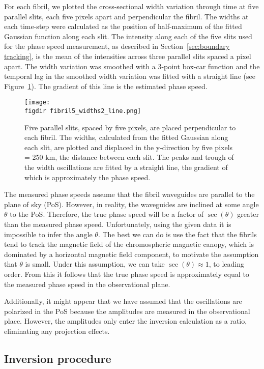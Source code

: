 \documentclass[12pt]{../style-files/ociamthesis}
\newcommand{\figdir}{../main/figures/chpt-4/} %
\begin{document}
For each fibril, we plotted the cross-sectional width variation through time at five parallel slits, each five pixels apart and perpendicular the fibril. The widths at each time-step were calculated as the position of half-maximum of the fitted Gaussian function along each slit. The intensity along each of the five slits used for the phase speed measurement, as described in Section~\ref{sec:boundary tracking}, is the mean of the intensities across three parallel slits spaced a pixel apart. The width variation was smoothed with a 3-point box-car function and the temporal lag in the smoothed width variation was fitted with a straight line (see Figure~\ref{fig:fibril5_width}). The gradient of this line is the estimated phase speed.

\begin{figure}
	\centering
	\texttt{[image: \\figdir fibril5\_widths2\_line.png]}
	\caption{Five parallel slits, spaced by five pixels, are placed perpendicular to each fibril. The widths, calculated from the fitted Gaussian along each slit, are plotted and displaced in the y-direction by five pixels = 250 km, the distance between each slit. The peaks and trough of the width oscillations are fitted by a straight line, the gradient of which is approximately the phase speed.}
	\label{fig:fibril5_width}
\end{figure}

The measured phase speeds assume that the fibril waveguides are parallel to the plane of sky (PoS). However, in reality, the waveguides are inclined at some angle $\theta$ to the PoS. Therefore, the true phase speed will be a factor of $\sec(\theta)$ greater than the measured phase speed. Unfortunately, using the given data it is impossible to infer the angle $\theta$. The best we can do is use the fact that the fibrils tend to track the magnetic field of the chromospheric magnetic canopy, which is dominated by a horizontal magnetic field component, to motivate the assumption that $\theta$ is small. Under this assumption, we can take $\sec(\theta) \approx 1$, to leading order. From this it follows that the true phase speed is approximately equal to the measured phase speed in the observational plane.

Additionally, it might appear that we have assumed that the oscillations are polarized in the PoS because the amplitudes are measured in the observational place. However, the amplitudes only enter the inversion calculation as a ratio, eliminating any projection effects.


\subsection{Inversion procedure}\label{sec:inversion}
\end{document}
